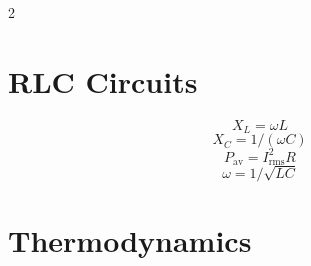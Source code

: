 \begin{multicols*}{2}




\section{RLC Circuits}

\begin{equation*}
    X_L = \omega L
\end{equation*}
\begin{equation*}
    X_C = 1 / \left( \omega C \right)
\end{equation*}
\begin{equation*}
    P_\mathrm{av} = I_\mathrm{rms}^2 R
\end{equation*}
\begin{equation*}
    \omega = 1 / \sqrt{LC}
\end{equation*}

\section{Thermodynamics}


\end{multicols*}
